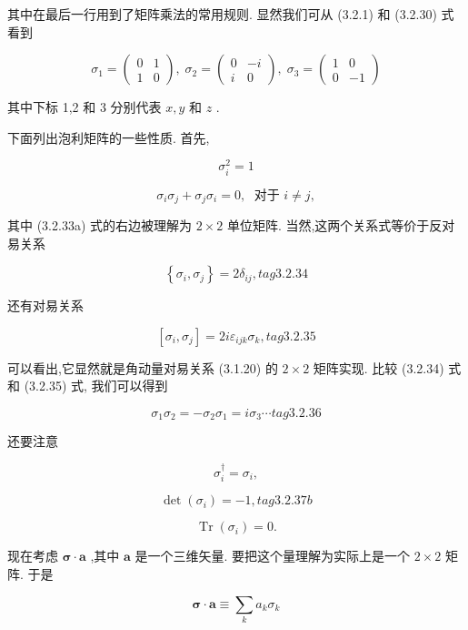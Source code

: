 其中在最后一行用到了矩阵乘法的常用规则. 显然我们可从 (3.2.1) 和 (3.2.30) 式看到

$$
{\sigma }_{1} = \left( \begin{array}{ll} 0 & 1 \\ 1 & 0 \end{array}\right) ,\;{\sigma }_{2} = \left( \begin{matrix} 0 & - i \\ i & 0 \end{matrix}\right) ,\;{\sigma }_{3} = \left( \begin{matrix} 1 & 0 \\ 0 & - 1 \end{matrix}\right) 
$$

其中下标 1,2 和 3 分别代表 $x, y$ 和 $z$ .

下面列出泡利矩阵的一些性质. 首先,

$$
{\sigma }_{i}^{2} = 1
$$



$$
{\sigma }_{i}{\sigma }_{j} + {\sigma }_{j}{\sigma }_{i} = 0,\;\text{ 对于 }i \neq j,
$$



其中 (3.2.33a) 式的右边被理解为 $2 \times 2$ 单位矩阵. 当然,这两个关系式等价于反对易关系

$$
\left\{ {{\sigma }_{i},{\sigma }_{j}}\right\} = 2{\delta }_{ij}, tag{3. 2.34}
$$

还有对易关系

$$
\left\lbrack {{\sigma }_{i},{\sigma }_{j}}\right\rbrack = {2i}{\varepsilon }_{ijk}{\sigma }_{k}, tag{3. 2.35}
$$

可以看出,它显然就是角动量对易关系 (3.1.20) 的 $2 \times 2$ 矩阵实现. 比较 (3.2.34) 式和 (3.2.35) 式, 我们可以得到

$$
{\sigma }_{1}{\sigma }_{2} = - {\sigma }_{2}{\sigma }_{1} = i{\sigma }_{3}\cdots tag{3. 2.36}
$$

还要注意

$$
{\sigma }_{i}^{ \dagger } = {\sigma }_{i},
$$



$$
\det \left( {\sigma }_{i}\right) = - 1, tag{3. 2.37b}
$$

$$
\operatorname{Tr}\left( {\sigma }_{i}\right) = 0.
$$



现在考虑 $\mathbf{\sigma } \cdot \mathbf{a}$ ,其中 $\mathbf{a}$ 是一个三维矢量. 要把这个量理解为实际上是一个 $2 \times 2$ 矩阵. 于是

$$
\mathbf{\sigma } \cdot \mathbf{a} \equiv \mathop{\sum }\limits_{k}{a}_{k}{\sigma }_{k}
$$


